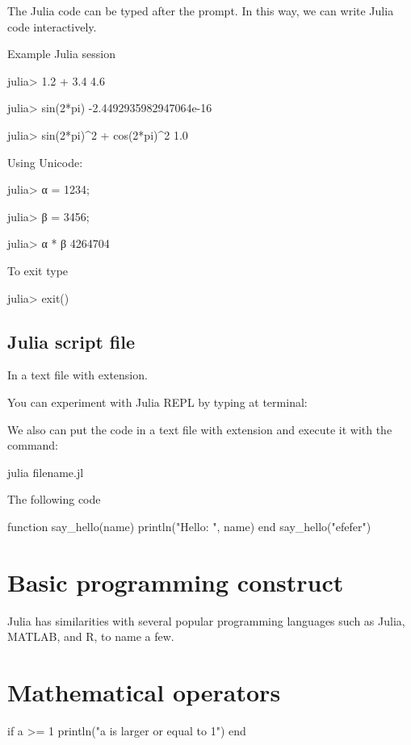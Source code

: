 The Julia code can be typed after the  prompt. In this way,
we can write Julia code interactively.


Example Julia session
\begin{textcode}
julia> 1.2 + 3.4
4.6

julia> sin(2*pi)
-2.4492935982947064e-16

julia> sin(2*pi)^2 + cos(2*pi)^2
1.0
\end{textcode}

Using Unicode:
\begin{textcode}
julia> α = 1234;

julia> β = 3456;

julia> α * β
4264704
\end{textcode}

To exit type
\begin{textcode}
julia> exit()
\end{textcode}


\subsection{Julia script file}

In a text file with  extension.

You can experiment with Julia REPL by typing 
at terminal:

We also can put the code in a text file with  extension and
execute it with the command:
%
\begin{bashcode}
julia filename.jl
\end{bashcode}

The following code
\begin{juliacode}
function say_hello(name)
    println("Hello: ", name)
end
say_hello("efefer")
\end{juliacode}


\section{Basic programming construct}

Julia has similarities with several popular programming languages
such as Julia, MATLAB, and R, to name a few.


\section{Mathematical operators}

\begin{juliacode}
if a >= 1
  println("a is larger or equal to 1")
end
\end{juliacode}

